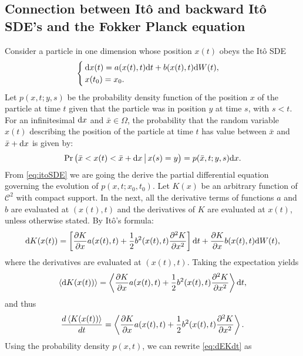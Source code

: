 \subsection{Connection between Itô and backward Itô SDE's and the Fokker Planck equation}
Consider a particle in one dimension whose position $x(t)$ obeys the Itô SDE
\begin{equation} \label{eq:itoSDE}
	\begin{cases}
		\rm dx(t) = a(x(t),t) \rm dt + b(x(t),t) \rm dW(t),\\
		x(t_0) = x_0. 
	\end{cases}
\end{equation}
Let $p(x,t;y,s)$ be the probability density function of the position $x$ of the particle at time $t$ given that the particle was in position $y$ at time $s$, with $s < t$. For an infinitesimal $\rm dx$ and $\bar{x} \in \Omega$, the probability that the random variable $x(t)$ describing the position of the particle at time $t$ has value between $\bar{x}$ and $\bar{x}+\rm dx$ is given by:
\begin{equation}
	\Pr\big(\bar{x} < x(t) < \bar{x} + \rm dx \,\big|\, x(s) = y\big) = p(\bar{x},t;y,s)\rm dx.
\end{equation}
 From \eqref{eq:itoSDE} we are going the derive the partial differential equation governing the evolution of $p(x,t;x_0,t_0)$. Let $K(x)$ be an arbitrary function of $\mathcal{C}^2$ with compact support. In the next, all the derivative terms of functions $a$ and $b$ are evaluated at $(x(t),t)$ and the derivatives of $K$ are evaluated at $x(t)$, unless otherwise stated. By Itô's formula:
\begin{equation}
	\rm dK(x(t)) = \left[\frac{\partial K}{\partial x} a(x(t),t) + \frac{1}{2}b^2(x(t),t) \frac{\partial^2 K}{\partial x^2} \right] \rm dt + \frac{\partial K}{\partial x}b(x(t),t) \rm dW(t),
\end{equation}
where the derivatives are evaluated at $(x(t),t)$. Taking the expectation yields
\begin{equation}
	\esp{\rm dK(x(t))} = \esp{\frac{\partial K}{\partial x} a(x(t),t) + \frac{1}{2}b^2(x(t),t) \frac{\partial^2 K}{\partial x^2}} \rm dt,
\end{equation}
and thus
\begin{equation} \label{eq:dEKdt}
	\frac{d\esp{K(x(t))}}{dt} = \esp{\frac{\partial K}{\partial x} a(x(t),t) + \frac{1}{2}b^2(x(t),t) \frac{\partial^2 K}{\partial x^2}}.
\end{equation}
Using the probability density $p(x,t)$, we can rewrite \eqref{eq:dEKdt} as
